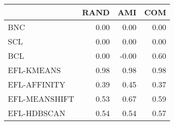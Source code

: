 \begin{tabular}{lrrr}
\toprule
 & RAND & AMI & COM \\
\midrule
BNC & 0.00 & 0.00 & 0.00 \\
SCL & 0.00 & 0.00 & 0.00 \\
BCL & 0.00 & -0.00 & 0.60 \\
EFL-KMEANS & 0.98 & 0.98 & 0.98 \\
EFL-AFFINITY & 0.39 & 0.45 & 0.37 \\
EFL-MEANSHIFT & 0.53 & 0.67 & 0.59 \\
EFL-HDBSCAN & 0.54 & 0.54 & 0.57 \\
\bottomrule
\end{tabular}
